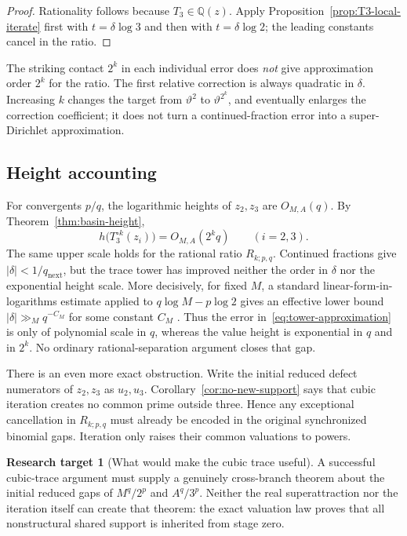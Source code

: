\documentclass[11pt,oneside]{article}
\theoremstyle{definition}
\newtheorem{target}[theorem]{Research target}
\theoremstyle{remark}
\newcommand{\Q}{\mathbb Q}
\newcommand{\thetaAE}{\vartheta}
\begin{document}
\begin{proof}
Rationality follows because \(T_3\in\Q(z)\).  Apply
Proposition~\ref{prop:T3-local-iterate} first with \(t=\delta\log3\) and then with
\(t=\delta\log2\); the leading constants cancel in the ratio.
\end{proof}

The striking contact \(2^k\) in each individual error does \emph{not} give approximation
order \(2^k\) for the ratio.  The first relative correction is always quadratic in
\(\delta\).  Increasing \(k\) changes the target from \(\thetaAE^2\) to
\(\thetaAE^{2^k}\), and eventually enlarges the correction coefficient; it does not turn a
continued-fraction error into a super-Dirichlet approximation.

\subsection{Height accounting}

For convergents \(p/q\), the logarithmic heights of \(z_2,z_3\) are \(O_{M,A}(q)\).  By
Theorem~\ref{thm:basin-height},
\begin{equation}
 h\bigl(T_3^{\circ k}(z_i)\bigr)=O_{M,A}(2^kq)
 \qquad(i=2,3).
 \label{eq:tower-height}
\end{equation}
The same upper scale holds for the rational ratio \(R_{k;p,q}\).  Continued fractions give
\(|\delta|<1/q_{\mathrm{next}}\), but the trace tower has improved neither the order in
\(\delta\) nor the exponential height scale.  More decisively, for fixed \(M\), a standard
linear-form-in-logarithms estimate applied to \(q\log M-p\log2\) gives an effective lower
bound \(|\delta|\gg_{M}q^{-C_M}\) for some constant \(C_M\)
\cite{BakerWustholz2007}.  Thus the error in~\eqref{eq:tower-approximation} is only of
polynomial scale in \(q\), whereas the value height is exponential in \(q\) and in \(2^k\).
No ordinary rational-separation argument closes that gap.

There is an even more exact obstruction.  Write the initial reduced defect numerators of
\(z_2,z_3\) as \(u_2,u_3\).  Corollary~\ref{cor:no-new-support} says that cubic iteration
creates no common prime outside three.  Hence any exceptional cancellation in
\(R_{k;p,q}\) must already be encoded in the original synchronized binomial gaps.  Iteration
only raises their common valuations to powers.

\begin{target}[What would make the cubic trace useful]
A successful cubic-trace argument must supply a genuinely cross-branch theorem about the
initial reduced gaps of \(M^q/2^p\) and \(A^q/3^p\).  Neither the real superattraction nor
the iteration itself can create that theorem: the exact valuation law proves that all
nonstructural shared support is inherited from stage zero.
\end{target}
\end{document}
